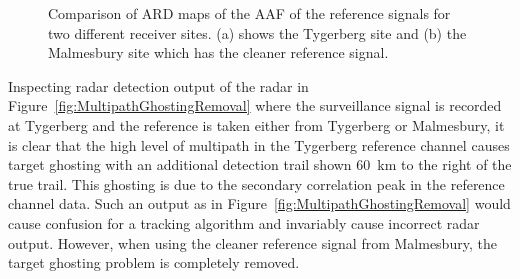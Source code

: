 \documentclass[english, 12pt]{report}
\begin{document}
\begin{figure}[ht]
\centering
{}
\hfill
{}
\caption[Comparison of ARD maps of the AAF of the reference signals for 2 different receiver sites]{Comparison of ARD maps of the AAF of the reference signals for two different receiver sites. (a) shows the Tygerberg site and (b) the Malmesbury site which has the cleaner reference signal.}
\label{fig:AAFCompare}
\end{figure}

Inspecting radar detection output of the radar in Figure~\ref{fig:MultipathGhostingRemoval} where the surveillance signal is recorded at Tygerberg and the reference is taken either from Tygerberg or Malmesbury, it is clear that the high level of multipath in the Tygerberg reference channel causes target ghosting with an additional detection trail shown 60~km to the right of the true trail. This ghosting is due to the secondary correlation peak in the reference channel data. Such an output as in Figure~\ref{fig:MultipathGhostingRemoval} would cause confusion for a tracking algorithm and invariably cause incorrect radar output. However, when using the cleaner reference signal from Malmesbury, the target ghosting problem is completely removed.
\end{document}
